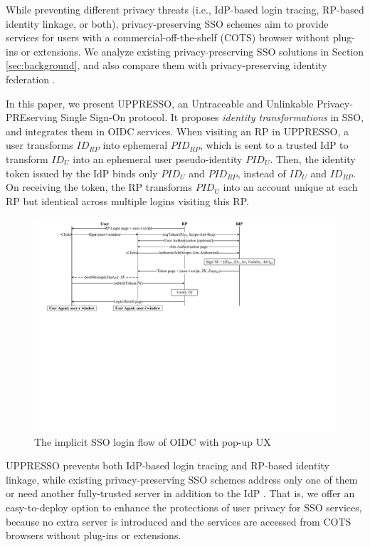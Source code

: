 While preventing different privacy threats (i.e., IdP-based login tracing, RP-based identity linkage, or both),
privacy-preserving SSO schemes \cite{maler2008venn, NIST2017draft, BrowserID, save-flow, SPRESSO,miso,POIDC} aim to provide services for users with a commercial-off-the-shelf (COTS) browser without plug-ins or extensions.
We analyze existing privacy-preserving SSO solutions in Section \ref{sec:background},
    and also compare them with privacy-preserving identity federation \cite{PseudoID, ELPASSO, UnlimitID, Opaak, uprov, hyperledge-idemix}.

In this paper, we present UPPRESSO, an Untraceable and Unlinkable Privacy-PREserving Single Sign-On protocol.
It proposes {\em identity transformations} in SSO,
 and integrates them in OIDC services.
When visiting an RP in UPPRESSO, a user transforms $ID_{RP}$ into ephemeral $PID_{RP}$, which is sent to a trusted IdP to transform $ID_U$ into an ephemeral user pseudo-identity $PID_U$.
Then, the identity token issued by the IdP binds only $PID_U$ and $PID_{RP}$, instead of $ID_U$ and $ID_{RP}$. On receiving the token, %
 the RP transforms $PID_U$ into an account unique at each RP but identical across multiple logins visiting this RP.


\begin{figure}[tb]
  \centering
  \includegraphics[width=0.85\linewidth]{fig/OIDC-pop.pdf}
  \caption{The implicit SSO login flow of OIDC with pop-up UX}
  \label{fig:OpenID}
\end{figure}

UPPRESSO prevents both IdP-based login tracing and RP-based identity linkage, while existing privacy-preserving SSO schemes address only one of them \cite{BrowserID, SPRESSO, NIST2017draft, save-flow,POIDC} or need another fully-trusted server in addition to the IdP \cite{miso,SPRESSO}.
That is, we offer an easy-to-deploy option to enhance the protections of user privacy for SSO services, because no extra server is introduced and the services are accessed from COTS browsers without plug-ins or extensions.

